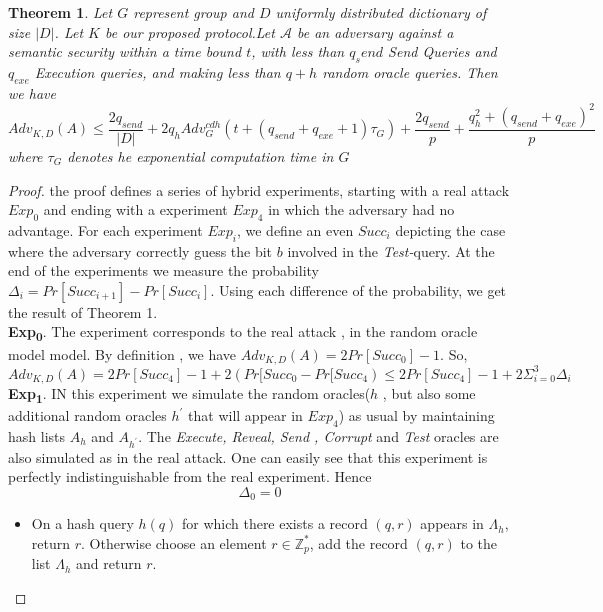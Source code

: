 \documentclass[a4paper,12pt]{report}
\newtheorem{theorem}{Theorem}
\begin{document}
\begin{theorem}
Let $G$ represent group and $D$ uniformly distributed dictionary of
size $|D|$. Let $K$ be our proposed protocol.Let $\mathcal{A}$ be an
adversary against a semantic security within a time bound $t$, with
less than $q_send$ Send Queries and $q_{exe}$ Execution queries, and
making less than $q+h$ random oracle queries. Then we have
\begin{equation}
Adv_{K,D}(A) \leq \frac{2q_{send}}{|D|} + 2q_hAdv_G^{cdh}(t+(q_{send}+ q_{exe}+1)\tau_{G}) + \frac{2q_{send}}{p}+ \frac{q_h^2 + (q_{send} +q_{exe})^2}{p}
\end{equation}
 where $\tau_{G}$ denotes he exponential computation time in $G$

\end{theorem}
\begin{proof}
the proof defines a series of hybrid experiments, starting with a real attack $Exp_0$ and ending with a experiment $Exp_4$ in which the adversary had no advantage. For each experiment $Exp_i$, we define an even $Succ_i$ depicting the case where the adversary correctly guess the bit $b$ involved in the \textit{Test-}query. At the end of the experiments we measure the probability $\Delta_i=Pr[Succ_{i+1}]- Pr[Succ_{i}] $. Using each difference of the probability, we get the result of Theorem 1.\\
\linebreak
\textbf{Exp\textsubscript{0}}. The experiment corresponds to the real attack , in the random oracle model model\cite{bellare}. By definition , we have $Adv_{K,D}(A)= 2Pr[Succ_{0}] -1$. So,
\begin{equation}
Adv_{K,D}(A)= 2Pr[Succ_{4}] -1 +2(Pr[Succ_{0}-Pr[Succ_{4}) \leq 2Pr[Succ_4] - 1 +2\Sigma_{i=0}^3 \Delta_i
\end{equation}
\linebreak \textbf{Exp\textsubscript{1}}. IN this experiment we
simulate the random oracles($h$ , but also some additional random
oracles $h^{\prime}$ that will appear in $Exp_4$) as usual by
maintaining hash lists $A_h$ and $A_{h^{\prime}}$. The
\textit{Execute, Reveal, Send , Corrupt} and \textit{Test} oracles
are also simulated as in the real attack. One can easily see that
this experiment is perfectly indistinguishable from the real
experiment. Hence
\begin{equation}
\Delta_0 = 0
\end{equation}
\begin{itemize}
\item On a hash query $h(q)$ for which there exists a record $(q,r)$ appears in $\Lambda_h$, return $r$. Otherwise choose an element $r \in \mathbb{Z}_{p}^{*}$, add the record $(q,r)$ to the list $\Lambda_h$ and return $r$.

\end{itemize}
\end{proof}
\end{document}
